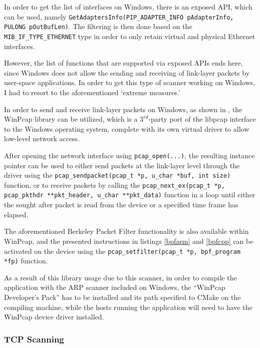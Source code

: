 \documentclass[a4paper,12pt]{article}
\begin{document}
	In order to get the list of interfaces on Windows, there is an exposed API, which can be used, namely \texttt{GetAdaptersInfo(PIP_ADAPTER_INFO pAdapterInfo, PULONG pOutBufLen)}. The filtering is then done based on the \texttt{MIB_IF_TYPE_ETHERNET} type in order to only retain virtual and physical Ethernet interfaces.
	
	However, the list of functions that are supported via exposed APIs ends here, since Windows does not allow the sending and receiving of link-layer packets by user-space applications. In order to get this type of scanner working on Windows, I had to resort to the aforementioned `extreme measures.'
	
	In order to send and receive link-layer packets on Windows, as shown in \cite{xing10}, the WinPcap library can be utilized, which is a $3^{rd}$-party port of the libpcap interface to the Windows operating system, complete with its own virtual driver to allow low-level network access.
	
	After opening the network interface using \texttt{pcap_open(...)}, the resulting instance pointer can be used to either send packets at the link-layer level through the driver using the \texttt{pcap_sendpacket(pcap_t *p, u_char *buf, int size)} function, or to receive packets by calling the \texttt{pcap_next_ex(pcap_t *p, pcap_pkthdr **pkt_header, u_char **pkt_data)} function in a loop until either the sought after packet is read from the device or a specified time frame has elapsed.
	
	The aforementioned Berkeley Packet Filter functionality is also available within WinPcap, and the presented instructions in listings \ref{bpfasm} and \ref{bpfcpp} can be activated on the device using the \texttt{pcap_setfilter(pcap_t *p, bpf_program *fp)} function.
	
	As a result of this library usage due to this scanner, in order to compile the application with the ARP scanner included on Windows, the ``WinPcap Developer's Pack'' has to be installed and its path specified to CMake on the compiling machine, while the hosts running the application will need to have the WinPcap device driver installed.

\subsubsection{TCP Scanning} \label{tcpscan}
 
\end{document}
